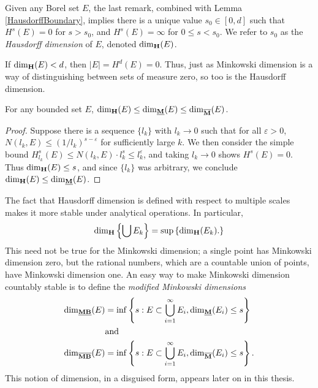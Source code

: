 Given any Borel set $E$, the last remark, combined with Lemma \ref{HausdorffBoundary}, implies there is a unique value $s_0 \in [0,d]$ such that $H^s(E) = 0$ for $s > s_0$, and $H^s(E) = \infty$ for $0 \leq s < s_0$. We refer to $s_0$ as the \emph{Hausdorff dimension} of $E$, denoted $\operatorname{\dim_{\mathbf{H}}}(E)$.

\begin{remark}
	If $\operatorname{\dim_{\mathbf{H}}}(E) < d$, then $|E| = H^d(E) = 0$. Thus, just as Minkowski dimension is a way of distinguishing between sets of measure zero, so too is the Hausdorff dimension.
\end{remark}

\begin{theorem}
	For any bounded set $E$, $\operatorname{\dim_{\mathbf{H}}}(E) \leq \operatorname{\dim_{\underline{\mathbf{M}}}}(E) \leq \operatorname{\dim_{\overline{\mathbf{M}}}}(E)$.
\end{theorem}
\begin{proof}
	Suppose there is a sequence $\{ l_k \}$ with $l_k \to 0$ such that for all $\varepsilon > 0$, $N(l_k,E) \leq (1/l_k)^{s - \varepsilon}$ for sufficiently large $k$. We then consider the simple bound $H^s_{l_k}(E) \leq N(l_k,E) \cdot l_k^s \leq l_k^\varepsilon$, and taking $l_k \to 0$ shows $H^s(E) = 0$. Thus $\operatorname{\dim_{\mathbf{H}}}(E) \leq s$, and since $\{ l_k \}$ was arbitrary, we conclude $\operatorname{\dim_{\mathbf{H}}}(E) \leq \operatorname{\dim_{\underline{\mathbf{M}}}}(E)$.
\end{proof}

The fact that Hausdorff dimension is defined with respect to multiple scales makes it more stable under analytical operations. In particular,
%
\[ \operatorname{\dim_{\mathbf{H}}} \left\{ \bigcup E_k \right\} = \sup \left\{ \operatorname{\dim_{\mathbf{H}}}(E_k). \right\} \]
%
This need not be true for the Minkowski dimension; a single point has Minkowski dimension zero, but the rational numbers, which are a countable union of points, have Minkowski dimension one. An easy way to make Minkowski dimension countably stable is to define the \emph{modified Minkowski dimensions}
%
\begin{align*}
	\operatorname{\dim_{\underline{\mathbf{MB}}}}(E) &= \inf \left\{ s : E \subset \bigcup_{i = 1}^\infty E_i, \operatorname{\dim_{\underline{\mathbf{M}}}}(E_i) \leq s \right\}\\
	&\text{and}\\
	\operatorname{\dim_{\overline{\mathbf{MB}}}}(E) &= \inf \left\{ s : E \subset \bigcup_{i = 1}^\infty E_i, \operatorname{\dim_{\overline{\mathbf{M}}}}(E_i) \leq s \right\}.
\end{align*}
%
This notion of dimension, in a disguised form, appears later on in this thesis.







